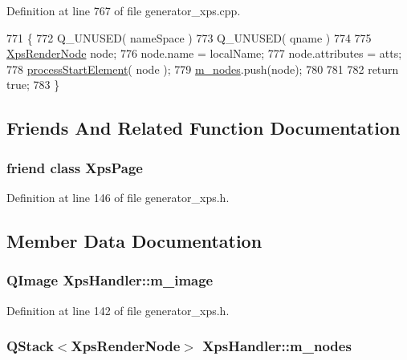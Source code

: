 Definition at line 767 of file generator\+\_\+xps.\+cpp.


\begin{DoxyCode}
771 \{
772     Q\_UNUSED( nameSpace )
773     Q\_UNUSED( qname )
774 
775     \hyperlink{classXpsRenderNode}{XpsRenderNode} node;
776     node.name = localName;
777     node.attributes = atts;
778     \hyperlink{classXpsHandler_aedb472a41dbaf8dc98f9c56082e20be9}{processStartElement}( node );
779     \hyperlink{classXpsHandler_ac1147d386794d189fd0fe4a904e74f62}{m\_nodes}.push(node);
780 
781 
782     return true;
783 \}
\end{DoxyCode}


\subsection{Friends And Related Function Documentation}
\hypertarget{classXpsHandler_a65618cf3329d418ab5b3e611e8e1d7f5}{
\subsubsection[{Xps\+Page}]{\setlength{\rightskip}{0pt plus 5cm}friend class {\bf Xps\+Page}\hspace{0.3cm}{\ttfamily [friend]}}}\label{classXpsHandler_a65618cf3329d418ab5b3e611e8e1d7f5}


Definition at line 146 of file generator\+\_\+xps.\+h.



\subsection{Member Data Documentation}
\hypertarget{classXpsHandler_aac7da032d9b9577bf8f1aa5194e40ba0}{
\subsubsection[{m\+\_\+image}]{\setlength{\rightskip}{0pt plus 5cm}Q\+Image Xps\+Handler\+::m\+\_\+image\hspace{0.3cm}{\ttfamily [protected]}}}\label{classXpsHandler_aac7da032d9b9577bf8f1aa5194e40ba0}


Definition at line 142 of file generator\+\_\+xps.\+h.

\hypertarget{classXpsHandler_ac1147d386794d189fd0fe4a904e74f62}{
\subsubsection[{m\+\_\+nodes}]{\setlength{\rightskip}{0pt plus 5cm}Q\+Stack$<${\bf Xps\+Render\+Node}$>$ Xps\+Handler\+::m\+\_\+nodes\hspace{0.3cm}{\ttfamily [protected]}}}\label{classXpsHandler_ac1147d386794d189fd0fe4a904e74f62}


